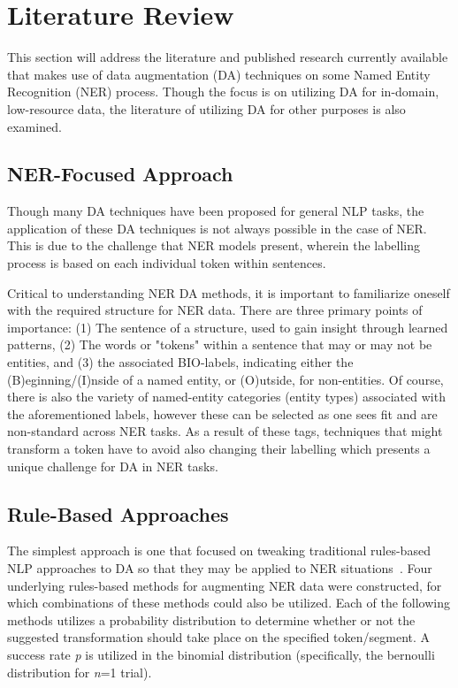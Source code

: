 \documentclass[12pt]{report}
\begin{document}
\chapter{Literature Review}
    This section will address the literature and published research currently available that makes use of data augmentation (DA) techniques on some Named Entity Recognition (NER) process. Though the focus is on utilizing DA for in-domain, low-resource data, the literature of utilizing DA for other purposes is also examined.
    
    \section{NER-Focused Approach}
        Though many DA techniques have been proposed for general NLP tasks, the application of these DA techniques is not always possible in the case of NER. This is due to the challenge that NER models present, wherein the labelling process is based on each individual token within sentences.
        
        Critical to understanding NER DA methods, it is important to familiarize oneself with the required structure for NER data. There are three primary points of importance: (1) The sentence of a structure, used to gain insight through learned patterns, (2) The words or "tokens" within a sentence that may or may not be entities, and (3) the associated BIO-labels, indicating either the (B)eginning/(I)nside of a named entity, or (O)utside, for non-entities. Of course, there is also the variety of named-entity categories (entity types) associated with the aforementioned labels, however these can be selected as one sees fit and are non-standard across NER tasks. As a result of these tags, techniques that might transform a token have to avoid also changing their labelling which presents a unique challenge for DA in NER tasks.
    
    \section{Rule-Based Approaches}
        
        The simplest approach is one that focused on tweaking traditional rules-based NLP approaches to DA so that they may be applied to NER situations~\cite{Rules}. Four underlying rules-based methods for augmenting NER data were constructed, for which combinations of these methods could also be utilized. Each of the following methods utilizes a probability distribution to determine whether or not the suggested transformation should take place on the specified token/segment. A success rate \textit{p} is utilized in the binomial distribution (specifically, the bernoulli distribution for \textit{n}=1 trial).
        
\end{document}
